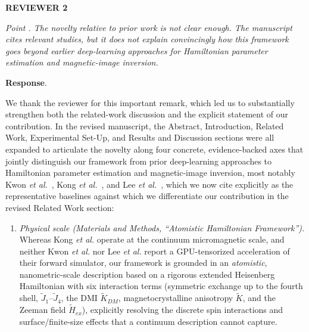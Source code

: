 \documentclass[review,12pt]{report}
\newenvironment{reviewer}{\setcounter{pointcounter}{1}}{}
\newcommand{\point}[1]{\medskip \noindent
 \textsl{{\fontseries{b}\selectfont Point \thepointcounter}.
 \stepcounter{pointcounter} #1}}
\newcommand{\reply}{\medskip \noindent \textbf{Response}.\ }
\begin{document}
 


\newpage

\textbf{REVIEWER 2}

\begin{reviewer}
\point{The novelty relative to prior work is not clear enough. The manuscript cites relevant studies, but it does not explain convincingly how this framework goes beyond earlier deep-learning approaches for Hamiltonian parameter estimation and magnetic-image inversion.}

\reply{We thank the reviewer for this important remark, which led us to substantially strengthen both the related-work discussion and the explicit statement of our contribution. In the revised manuscript, the Abstract, Introduction, Related Work, Experimental Set-Up, and Results and Discussion sections were all expanded to articulate the novelty along four concrete, evidence-backed axes that jointly distinguish our framework from prior deep-learning approaches to Hamiltonian parameter estimation and magnetic-image inversion, most notably Kwon \textit{et al.}~\cite{kwon2020magnetic}, Kong \textit{et al.}~\cite{kong2023quantifying}, and Lee \textit{et al.}~\cite{lee2024deep}, which we now cite explicitly as the representative baselines against which we differentiate our contribution in the revised Related Work section:

\begin{enumerate}
\item \textit{Physical scale (Materials and Methods, ``Atomistic Hamiltonian Framework'').} Whereas Kong \textit{et al.} operate at the continuum micromagnetic scale, and neither Kwon \textit{et al.} nor Lee \textit{et al.} report a GPU-tensorized acceleration of their forward simulator, our framework is grounded in an \emph{atomistic}, nanometric-scale description based on a rigorous extended Heisenberg Hamiltonian with six interaction terms (symmetric exchange up to the fourth shell, $\tilde{J}_1$--$\tilde{J}_4$, the DMI $\tilde{K}_{DM}$, magnetocrystalline anisotropy $\tilde{K}$, and the Zeeman field $\tilde{H}_{ex}$), explicitly resolving the discrete spin interactions and surface/finite-size effects that a continuum description cannot capture.


\end{enumerate}}
\end{reviewer}
\end{document}
